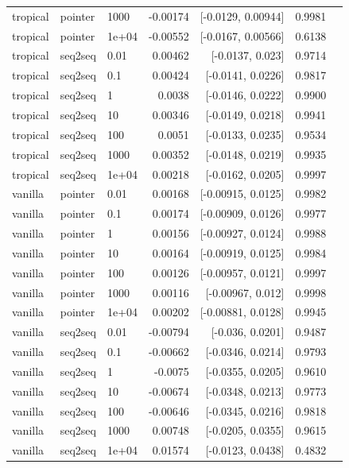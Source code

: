 \documentclass[10pt]{article}
\begin{document}
{\begin{longtable}{lllrrrl}
tropical & pointer & 1000 & -0.00174 & [-0.0129, 0.00944] & 0.9981 & \\
tropical & pointer & 1e+04 & -0.00552 & [-0.0167, 0.00566] & 0.6138 & \\
tropical & seq2seq & 0.01 & 0.00462 & [-0.0137, 0.023] & 0.9714 & \\
tropical & seq2seq & 0.1 & 0.00424 & [-0.0141, 0.0226] & 0.9817 & \\
tropical & seq2seq & 1 & 0.0038 & [-0.0146, 0.0222] & 0.9900 & \\
tropical & seq2seq & 10 & 0.00346 & [-0.0149, 0.0218] & 0.9941 & \\
tropical & seq2seq & 100 & 0.0051 & [-0.0133, 0.0235] & 0.9534 & \\
tropical & seq2seq & 1000 & 0.00352 & [-0.0148, 0.0219] & 0.9935 & \\
tropical & seq2seq & 1e+04 & 0.00218 & [-0.0162, 0.0205] & 0.9997 & \\
vanilla & pointer & 0.01 & 0.00168 & [-0.00915, 0.0125] & 0.9982 & \\
vanilla & pointer & 0.1 & 0.00174 & [-0.00909, 0.0126] & 0.9977 & \\
vanilla & pointer & 1 & 0.00156 & [-0.00927, 0.0124] & 0.9988 & \\
vanilla & pointer & 10 & 0.00164 & [-0.00919, 0.0125] & 0.9984 & \\
vanilla & pointer & 100 & 0.00126 & [-0.00957, 0.0121] & 0.9997 & \\
vanilla & pointer & 1000 & 0.00116 & [-0.00967, 0.012] & 0.9998 & \\
vanilla & pointer & 1e+04 & 0.00202 & [-0.00881, 0.0128] & 0.9945 & \\
vanilla & seq2seq & 0.01 & -0.00794 & [-0.036, 0.0201] & 0.9487 & \\
vanilla & seq2seq & 0.1 & -0.00662 & [-0.0346, 0.0214] & 0.9793 & \\
vanilla & seq2seq & 1 & -0.0075 & [-0.0355, 0.0205] & 0.9610 & \\
vanilla & seq2seq & 10 & -0.00674 & [-0.0348, 0.0213] & 0.9773 & \\
vanilla & seq2seq & 100 & -0.00646 & [-0.0345, 0.0216] & 0.9818 & \\
vanilla & seq2seq & 1000 & 0.00748 & [-0.0205, 0.0355] & 0.9615 & \\
vanilla & seq2seq & 1e+04 & 0.01574 & [-0.0123, 0.0438] & 0.4832 & \\
\bottomrule
\end{longtable}
}
\end{document}
